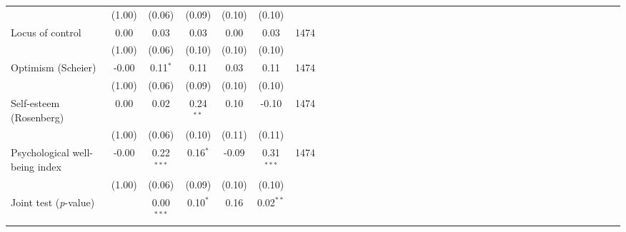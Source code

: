 {\begin{tabular}{l*{6}{SSSSSc}}
          &   (1.00)&   (0.06)&   (0.09)&   (0.10)&   (0.10)&         \\
Locus of control&     0.00&     0.03&     0.03&     0.00&     0.03&     1474\\
          &   (1.00)&   (0.06)&   (0.10)&   (0.10)&   (0.10)&         \\
Optimism (Scheier)&    -0.00&0.11$^{*}$&     0.11&     0.03&     0.11&     1474\\
          &   (1.00)&   (0.06)&   (0.09)&   (0.10)&   (0.10)&         \\
Self-esteem (Rosenberg)&     0.00&     0.02&0.24$^{**}$&     0.10&    -0.10&     1474\\
          &   (1.00)&   (0.06)&   (0.10)&   (0.11)&   (0.11)&         \\
Psychological well-being index&    -0.00&0.22$^{***}$&0.16$^{*}$&    -0.09&0.31$^{***}$&     1474\\
          &   (1.00)&   (0.06)&   (0.09)&   (0.10)&   (0.10)&         \\
\midrule Joint test (\emph{p}-value)&         &0.00$^{***}$&0.10$^{*}$&     0.16&0.02$^{**}$&         \\
\bottomrule
\end{tabular}
}
